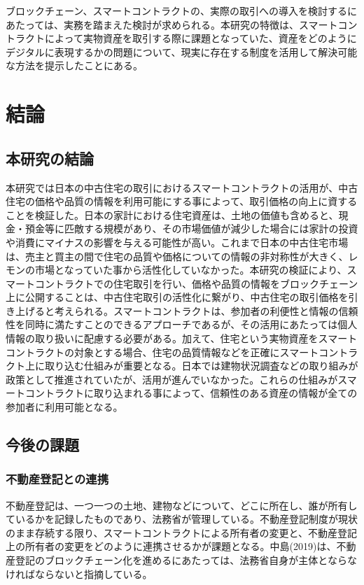 \documentclass[a4paper,fontsize=11pt,report,notitlepage,line_length=38zw,number_of_lines=40,dvipdfmx]{jlreq}
\begin{document}

ブロックチェーン、スマートコントラクトの、実際の取引への導入を検討するにあたっては、実務を踏まえた検討が求められる。本研究の特徴は、スマートコントラクトによって実物資産を取引する際に課題となっていた、資産をどのようにデジタルに表現するかの問題について、現実に存在する制度を活用して解決可能な方法を提示したことにある。


\chapter{結論}
\section{本研究の結論}
本研究では日本の中古住宅の取引におけるスマートコントラクトの活用が、中古住宅の価格や品質の情報を利用可能にする事によって、取引価格の向上に資することを検証した。日本の家計における住宅資産は、土地の価値も含めると、現金・預金等に匹敵する規模があり、その市場価値が減少した場合には家計の投資や消費にマイナスの影響を与える可能性が高い。これまで日本の中古住宅市場は、売主と買主の間で住宅の品質や価格についての情報の非対称性が大きく、レモンの市場となっていた事から活性化していなかった。本研究の検証により、スマートコントラクトでの住宅取引を行い、価格や品質の情報をブロックチェーン上に公開することは、中古住宅取引の活性化に繋がり、中古住宅の取引価格を引き上げると考えられる。スマートコントラクトは、参加者の利便性と情報の信頼性を同時に満たすことのできるアプローチであるが、その活用にあたっては個人情報の取り扱いに配慮する必要がある。加えて、住宅という実物資産をスマートコントラクトの対象とする場合、住宅の品質情報などを正確にスマートコントラクト上に取り込む仕組みが重要となる。日本では建物状況調査などの取り組みが政策として推進されていたが、活用が進んでいなかった。これらの仕組みがスマートコントラクトに取り込まれる事によって、信頼性のある資産の情報が全ての参加者に利用可能となる。

\section{今後の課題}
\subsection{不動産登記との連携}
不動産登記は、一つ一つの土地、建物などについて、どこに所在し、誰が所有しているかを記録したものであり、法務省が管理している。不動産登記制度が現状のまま存続する限り、スマートコントラクトによる所有者の変更と、不動産登記上の所有者の変更をどのように連携させるかが課題となる。中島(2019)\cite{nakajima2019}は、不動産登記のブロックチェーン化を進めるにあたっては、法務省自身が主体とならなければならないと指摘している。
\end{document}

